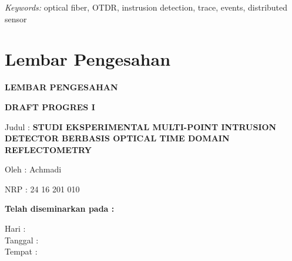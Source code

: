 \documentclass[12pt]{article}
\providecommand{\keyworden}[1]{\textit{Keywords: } #1}
\begin{document}
	\keyworden{optical fiber, OTDR, instrusion detection, trace, events, distributed sensor}
	

\newpage
\thispagestyle{plain}
\mbox{}


\newpage

	\section{Lembar Pengesahan}
	
	\begin{center}
		\textbf{LEMBAR PENGESAHAN}
	\end{center}
	
	\begin{center}
		\textbf{DRAFT PROGRES I}
	\end{center}

	\vspace{10pt}

	\begin{flushleft}
		Judul	: \textbf{STUDI EKSPERIMENTAL MULTI-POINT INTRUSION DETECTOR BERBASIS OPTICAL TIME DOMAIN REFLECTOMETRY}
	\end{flushleft}

	\begin{flushleft}
		Oleh : Achmadi
	\end{flushleft}

	\begin{flushleft}
		NRP : 24 16 201 010
	\end{flushleft}

	\vspace{20pt}
	
	\begin{center}
		\textbf{Telah diseminarkan pada :}
	\end{center}

	\vspace{10pt}

	\begin{flushleft}
		Hari \hspace{17pt}: \\
		Tanggal :\\
		Tempat \hspace{3pt}:  \\
	\end{flushleft}
\end{document}
